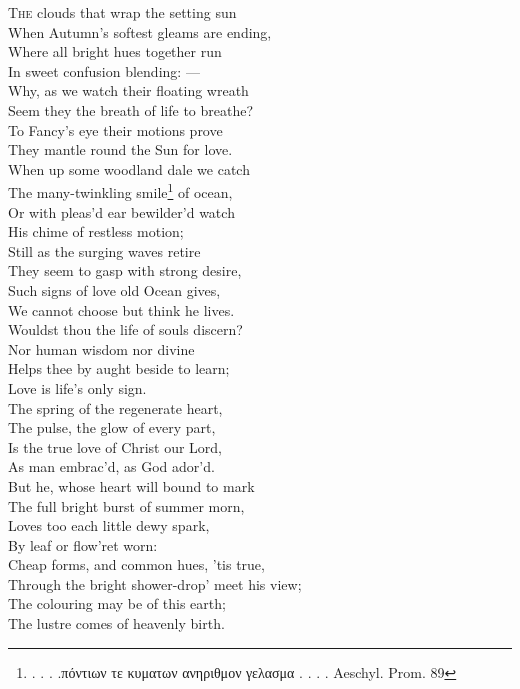 \textsc{The} clouds that wrap the setting sun \\
 When Autumn’s softest gleams are ending, \\
 Where all bright hues together run \\
 In sweet confusion blending: — \\
 Why, as we watch their floating wreath \\
 Seem they the breath of life to breathe? \\
 To Fancy’s eye their motions prove \\
 They mantle round the Sun for love. \\
  When up some woodland dale we catch \\
 The many-twinkling smile\footnote{\textgreek{. . . .πόντιων τε κυματων ανηριθμον γελασμα . . . .} Aeschyl. Prom. 89} of ocean, \\
 Or with pleas’d ear bewilder’d watch \\
 His chime of restless motion; \\
 Still as the surging waves retire \\
 They seem to gasp with strong desire, \\
 Such signs of love old Ocean gives, \\
 We cannot choose but think he lives. \\
  Wouldst thou the life of souls discern? \\
 Nor human wisdom nor divine \\
 Helps thee by aught beside to learn; \\
 Love is life’s only sign. \\
 The spring of the regenerate heart, \\
 The pulse, the glow of every part, \\
 Is the true love of Christ our Lord, \\
 As man embrac’d, as God ador’d. \\
  But he, whose heart will bound to mark \\
 The full bright burst of summer morn, \\
 Loves too each little dewy spark, \\
 By leaf or flow’ret worn: \\
 Cheap forms, and common hues, ’tis true, \\
 Through the bright shower-drop’ meet his view; \\
 The colouring may be of this earth; \\
 The lustre comes of heavenly birth. \\
